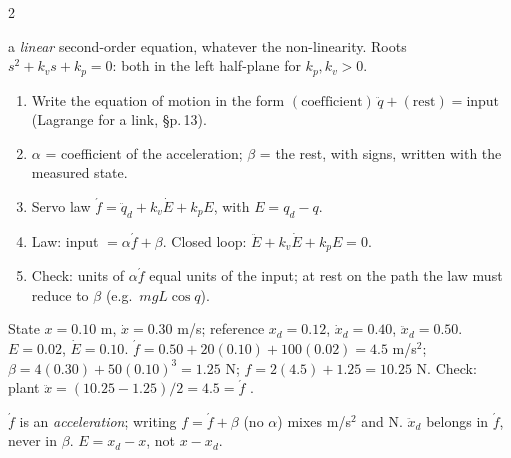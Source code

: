 \begin{multicols}{2}
\begin{deriv}
a \emph{linear} second-order equation, whatever the non-linearity. Roots $s^2+k_vs+k_p=0$: both in the left half-plane for $k_p,k_v>0$.
\end{deriv}
\begin{recipe}\label{w9:rec}
\begin{enumerate}
\item Write the equation of motion in the form $(\text{coefficient})\,\ddot q+(\text{rest})=\text{input}$ (Lagrange for a link, \S p.\,13).
\item $\alpha$ = coefficient of the acceleration; $\beta$ = the rest, with signs, written with the measured state.
\item Servo law $\acute f=\ddot q_d+k_v\dot E+k_pE$, with $E=q_d-q$.
\item Law: input $=\alpha\acute f+\beta$. Closed loop: $\ddot E+k_v\dot E+k_pE=0$.
\item Check: units of $\alpha\acute f$ equal units of the input; at rest on the path the law must reduce to $\beta$ (e.g.\ $mgL\cos q$).
\end{enumerate}
\end{recipe}
\begin{worked}[cubic spring, slide structure; $m=2$, $b=4$, $k=50$, $k_p=100$, $k_v=20$]
State $x=0.10$ m, $\dot x=0.30$ m/s; reference $x_d=0.12$, $\dot x_d=0.40$, $\ddot x_d=0.50$. $E=0.02$, $\dot E=0.10$. $\acute f=0.50+20(0.10)+100(0.02)=4.5$ m/s$^2$; $\beta=4(0.30)+50(0.10)^3=1.25$ N; $f=2(4.5)+1.25=10.25$ N. Check: plant $\ddot x=(10.25-1.25)/2=4.5=\acute f$ \checkmark. \chk
\end{worked}
\begin{trap}
$\acute f$ is an \emph{acceleration}; writing $f=\acute f+\beta$ (no $\alpha$) mixes m/s$^2$ and N. $\ddot x_d$ belongs in $\acute f$, never in $\beta$. $E=x_d-x$, not $x-x_d$.
\end{trap}

\begin{wnfig}
\begin{center}\small
\wnAqfalse
\def\wnDD{\ddot x_d}\def\wnD{\dot x_d}\def\wnR{x_d}\def\wnKp{k_p}\def\wnKv{k_v}\def\wnAl{m}\def\wnBe{b\dot x+kx^3}\def\wnPl{m\ddot x{+}b\dot x{+}kx^3{=}f}\def\wnU{f}\def\wnP{x}\def\wnV{\dot x}\def\wnE{E}\def\wnEd{\dot E}\def\wnFp{\acute f}
\wnloop
\end{center}
\cdlegend
{}
\end{wnfig}
\begin{wnfig}\end{wnfig}


\end{multicols}
